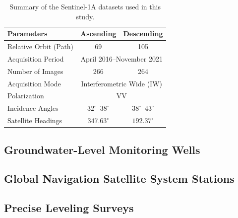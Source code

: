 \begin{table}[H]
	\centering
	\caption{Summary of the Sentinel-1A datasets used in this study.}
	\label{tab:sentinel1_info}
	
	\begin{tabular}{lcc}
		\toprule
		\textbf{Parameters} & \textbf{Ascending} & \textbf{Descending} \\
		\midrule
		Relative Orbit (Path) & 69 & 105 \\
		\multicolumn{1}{l}{Acquisition Period} & \multicolumn{2}{c}{April 2016--November 2021} \\
		Number of Images      & 266 & 264 \\
		\multicolumn{1}{l}{Acquisition Mode} & \multicolumn{2}{c}{Interferometric Wide (IW)} \\
		\multicolumn{1}{l}{Polarization} & \multicolumn{2}{c}{VV} \\
		Incidence Angles & $32^{\circ}$--$38^{\circ}$ & $38^{\circ}$--$43^{\circ}$ \\
		Satellite Headings & $347.63^{\circ}$ & $192.37^{\circ}$ \\
		\bottomrule
	\end{tabular}
\end{table}

\subsection{Groundwater-Level Monitoring Wells}
\label{subsubsec:gwl_wells}


\subsection{Global Navigation Satellite System Stations}
\label{subsubsec:gnss}

\subsection{Precise Leveling Surveys}
\label{subsubsec:precise_leveling}

